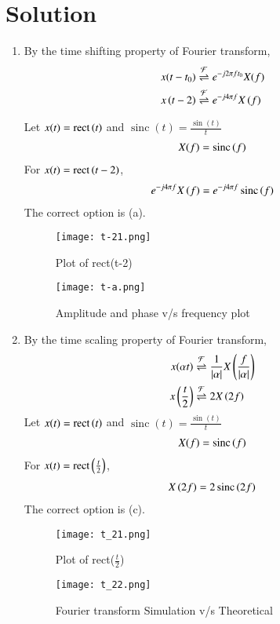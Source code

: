\documentclass[journal,12pt,twocolumn]{IEEEtran}
\DeclareMathOperator{\sinc}{sinc}
\DeclareMathOperator{\rect}{rect}
\begin{document}
\section*{Solution}
\begin{enumerate}
    
\item By the time shifting property of Fourier transform,
\begin{align}
    x(t - t_0)&\overset{\mathcal{F}}{ \rightleftharpoons}{e^{-j2\pi ft_0}X(f)}\\
    x\left({t-2}\right)&\overset{\mathcal{F}}{ \rightleftharpoons} {e^{-{j4\pi f}}X\left(f\right)}
\end{align}


Let $x(t) = \rect{\brak{t}}$ and $\sinc(t) = \frac{\sin(t)}{t}$
\begin{align}
    X(f) = \sinc\brak{f}
\end{align}
For $x(t) = \rect{\brak{t-2}}$,
\begin{align}
    e^{-{j4\pi f}}X\brak{f} = e^{-{j4\pi f}}\sinc\brak{{f}}
\end{align}
The correct option is (a).
\begin{figure}
    \centering
    \texttt{[image: t-21.png]}
    \caption{Plot of rect(t-2)}
    \label{fig:my_label}
\end{figure}

\begin{figure}[htp]
    \centering
    \texttt{[image: t-a.png]}
    \caption{Amplitude and phase v/s frequency plot}
    \label{fig:my_label4}
\end{figure}
\item By the time scaling property of Fourier transform,
\begin{align}
    x(\alpha t)&\overset{\mathcal{F}}{ \rightleftharpoons}{\frac{1}{|\alpha|}}X\left(\frac{f}{|\alpha|}\right)\\
    x\left(\frac{t}{2}\right)&\overset{\mathcal{F}}{ \rightleftharpoons}2X\left(2f\right)
\end{align}
Let $x(t) = \rect{\brak{t}}$ and $\sinc(t) = \frac{\sin(t)}{t}$
\begin{align}
    X(f) = \sinc\brak{f}
\end{align}
For $x(t) = \rect{\brak{\frac{t}{2}}}$,
\begin{align}
    {2}X\brak{{2f}} = {2}\sinc\brak{{2f}}
\end{align}
The correct option is (c).
\begin{figure}
    \centering
    \texttt{[image: t\_21.png]}
    \caption{Plot of rect($\frac{t}{2}$)}
    \label{fig:my_label2}

    \centering
    \texttt{[image: t\_22.png]}
    \caption{Fourier transform Simulation v/s Theoretical}
    \label{fig:my_label3}
\end{figure}
\end{enumerate}
\end{document}
